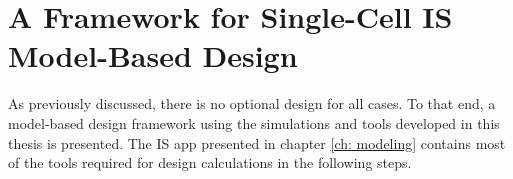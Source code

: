 
\section[IS Model-Based Design Framework]{A Framework for Single-Cell IS Model-Based Design}

\par As previously discussed, there is no optional design for all cases. To that end, a model-based design framework using the simulations and tools developed in this thesis is presented. The IS app presented in chapter \ref{ch: modeling} contains most of the tools required for design calculations in the following steps.

